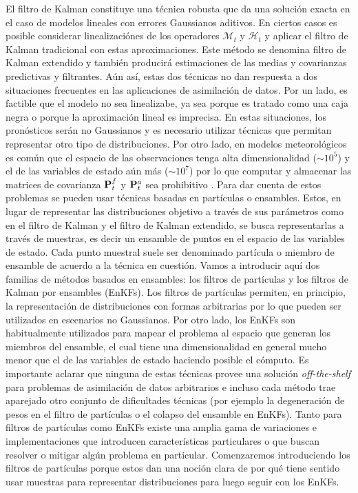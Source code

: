 El filtro de Kalman constituye una técnica robusta que da una solución exacta en el caso de modelos lineales con errores Gaussianos aditivos. En ciertos casos es posible considerar linealizaciónes de los operadores $\mathcal{M}_t$ y $\mathcal{H}_t$ y aplicar el filtro de Kalman tradicional con estas aproximaciones. Este método se denomina filtro de Kalman extendido y también producirá estimaciones de las medias y covarianzas predictivas y filtrantes. Aún así, estas dos técnicas no dan respuesta a dos situaciones frecuentes en las aplicaciones de asimilación de datos. Por un lado, es factible que el modelo no sea linealizabe, ya sea porque es tratado como una caja negra o porque la aproximación lineal es imprecisa. En estas situaciones, los pronósticos serán no Gaussianos y es necesario utilizar técnicas que permitan representar otro tipo de distribuciones. Por otro lado, en modelos meteorológicos es común que el espacio de las observaciones tenga alta dimensionalidad ($\sim 10^5$) y el de las variables de estado aún más ($\sim 10^7$) por lo que computar y almacenar las matrices de covarianza $\mathbf{P}_t^f$ y $\mathbf{P}_t^a$ sea prohibitivo \citep{Katzfuss2016}. Para dar cuenta de estos problemas se pueden usar técnicas basadas en partículas o ensambles. Estos, en lugar de representar las distribuciones objetivo a través de sus parámetros como en el filtro de Kalman y el filtro de Kalman extendido, se busca representarlas a través de muestras, es decir un ensamble de puntos en el espacio de las variables de estado. Cada punto muestral suele ser denominado partícula o miembro de ensamble de acuerdo a la técnica en cuestión. Vamos a introducir aquí dos familias de métodos basados en ensambles: los filtros de partículas y los filtros de Kalman por ensambles (EnKFs). Los filtros de partículas permiten, en principio, la representación de distribuciones con formas arbitrarias por lo que pueden ser utilizados en escenarios no Gaussianos. Por otro lado, los EnKFs son habitualmente utilizados para mapear el problema al espacio que generan los miembros del ensamble, el cual tiene una dimensionalidad en general mucho menor que el de las variables de estado haciendo posible el cómputo. Es importante aclarar que ninguna de estas técnicas provee una solución \textit{off-the-shelf} para problemas de asimilación de datos arbitrarios e incluso cada método trae aparejado otro conjunto de dificultades técnicas (por ejemplo la degeneración de pesos en el filtro de partículas o el colapso del ensamble en EnKFs). Tanto para filtros de partículas como EnKFs existe una amplia gama de variaciones e implementaciones que introducen características particulares o que buscan resolver o mitigar algún problema en particular. Comenzaremos introduciendo los filtros de partículas porque estos dan una noción clara de por qué tiene sentido usar muestras para representar distribuciones para luego seguir con los EnKFs.

